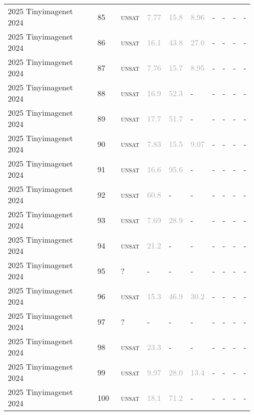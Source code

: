 \begin{center}
{\begin{longtable}{@{}llllllllll@{}}
2025 Tinyimagenet 2024 & 85 & ~\textsc{unsat} & \textcolor{darkgray}{7.77} & \textcolor{darkgray}{15.8} & \textcolor{darkgray}{8.96} & - & - & - & - \\
2025 Tinyimagenet 2024 & 86 & ~\textsc{unsat} & \textcolor{darkgray}{16.1} & \textcolor{darkgray}{43.8} & \textcolor{darkgray}{27.0} & - & - & - & - \\
2025 Tinyimagenet 2024 & 87 & ~\textsc{unsat} & \textcolor{darkgray}{7.76} & \textcolor{darkgray}{15.7} & \textcolor{darkgray}{8.95} & - & - & - & - \\
2025 Tinyimagenet 2024 & 88 & ~\textsc{unsat} & \textcolor{darkgray}{16.9} & \textcolor{darkgray}{52.3} & - & - & - & - & - \\
2025 Tinyimagenet 2024 & 89 & ~\textsc{unsat} & \textcolor{darkgray}{17.7} & \textcolor{darkgray}{51.7} & - & - & - & - & - \\
2025 Tinyimagenet 2024 & 90 & ~\textsc{unsat} & \textcolor{darkgray}{7.83} & \textcolor{darkgray}{15.5} & \textcolor{darkgray}{9.07} & - & - & - & - \\
2025 Tinyimagenet 2024 & 91 & ~\textsc{unsat} & \textcolor{darkgray}{16.6} & \textcolor{darkgray}{95.6} & - & - & - & - & - \\
2025 Tinyimagenet 2024 & 92 & ~\textsc{unsat} & \textcolor{darkgray}{60.8} & - & - & - & - & - & - \\
2025 Tinyimagenet 2024 & 93 & ~\textsc{unsat} & \textcolor{darkgray}{7.69} & \textcolor{darkgray}{28.9} & - & - & - & - & - \\
2025 Tinyimagenet 2024 & 94 & ~\textsc{unsat} & \textcolor{darkgray}{21.2} & - & - & - & - & - & - \\
2025 Tinyimagenet 2024 & 95 & ~? & - & - & - & - & - & - & - \\
2025 Tinyimagenet 2024 & 96 & ~\textsc{unsat} & \textcolor{darkgray}{15.3} & \textcolor{darkgray}{46.9} & \textcolor{darkgray}{30.2} & - & - & - & - \\
2025 Tinyimagenet 2024 & 97 & ~? & - & - & - & - & - & - & - \\
2025 Tinyimagenet 2024 & 98 & ~\textsc{unsat} & \textcolor{darkgray}{23.3} & - & - & - & - & - & - \\
2025 Tinyimagenet 2024 & 99 & ~\textsc{unsat} & \textcolor{darkgray}{9.97} & \textcolor{darkgray}{28.0} & \textcolor{darkgray}{13.4} & - & - & - & - \\
2025 Tinyimagenet 2024 & 100 & ~\textsc{unsat} & \textcolor{darkgray}{18.1} & \textcolor{darkgray}{71.2} & - & - & - & - & - \\

\end{longtable}}
\end{center}
